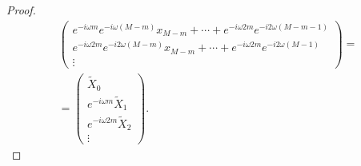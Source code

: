 \begin{proof}
\begin{eqnarray}
\begin{pmatrix}
e^{-i \omega m } e^{-i \omega \left( M - m \right) } x_{M - m} + 
\cdots + 
e^{-i \omega 2 m } e^{-i 2 \omega \left( M - m - 1\right) }\\ 
e^{-i \omega 2 m } e^{-i 2 \omega \left( M - m \right) } x_{M - m} + 
\cdots + 
e^{-i \omega 2 m } e^{-i 2 \omega \left( M - 1\right) }\\ 
\vdots 
\end{pmatrix} = 
\nonumber \\
= 
\begin{pmatrix}
\tilde{X}_0 \\
e^{-i \omega m} \tilde{X}_1 \\
e^{-i \omega 2 m} \tilde{X}_2 \\
\vdots  
\end{pmatrix}.
\nonumber
\end{eqnarray}
\end{proof}


